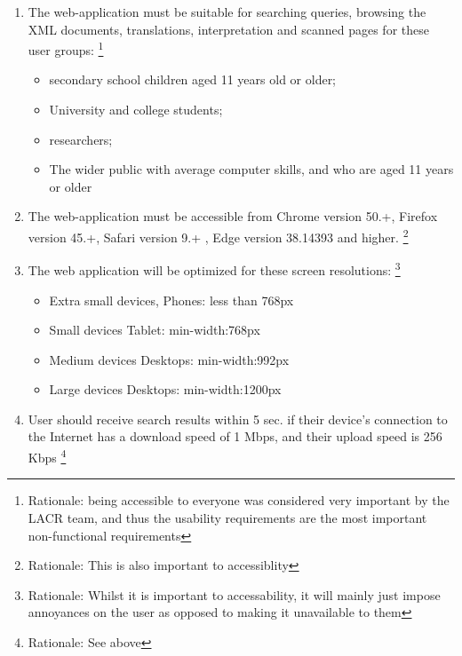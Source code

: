 \documentclass[10pt,a4paper]{report}
\begin{document}
        \begin{enumerate}
            \item The web-application must be suitable for searching queries, browsing the XML documents, translations, interpretation and scanned pages for these user groups:
            \footnote{Rationale: being accessible to everyone was considered very important by the LACR team, and thus the usability requirements are the most important non-functional requirements}
            \begin{itemize}
                \item secondary school children aged 11 years old or older;
                \item University and college students;
                \item researchers;
                \item The wider public with average computer skills, and who are aged 11 years or older
            \end{itemize}
            
            \item The web-application must be accessible from Chrome version 50.+, Firefox version 45.+, Safari version 9.+ , Edge version 38.14393 and higher.
            \footnote{Rationale: This is also important to accessiblity}
            
            \item The web application will be optimized for these screen resolutions:
            \footnote{Rationale: Whilst it is important to accessability, it will mainly just impose annoyances on the user as opposed to making it unavailable to them}
            \begin{itemize}
                \item Extra small devices, Phones: less than 768px
                \item Small devices Tablet: min-width:768px
                \item Medium devices Desktops: min-width:992px
                \item Large devices Desktops: min-width:1200px
            \end{itemize}
            
            \item User should receive search results within 5 sec. if their device's connection to the Internet has a download speed of 1 Mbps, and their upload speed is 256 Kbps
            \footnote{Rationale: See above}
            

\end{enumerate}
\end{document}
